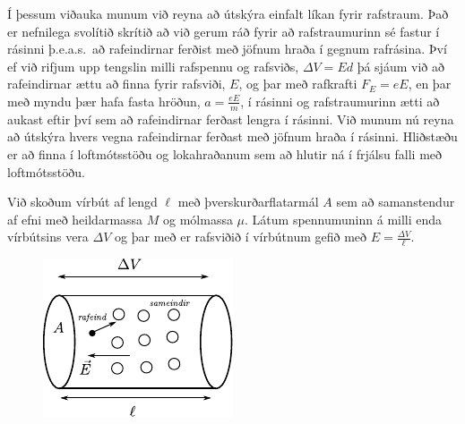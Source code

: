 \ifdefined \wholebook \else\documentclass[oneside]{book}\usepackage{EdlBook}\graphicspath{{figures/}}
\begin{document}
Í þessum viðauka munum við reyna að útskýra einfalt líkan fyrir rafstraum. Það er nefnilega svolítið skrítið að við gerum ráð fyrir að rafstraumurinn sé fastur í rásinni þ.e.a.s.~að rafeindirnar ferðist með jöfnum hraða í gegnum rafrásina. Því ef við rifjum upp tengslin milli rafspennu og rafsviðs, $\Delta V = Ed$ þá sjáum við að rafeindirnar ættu að finna fyrir rafsviði, $E$, og þar með rafkrafti $F_E = eE$, en þar með myndu þær hafa fasta hröðun, $a = \frac{eE}{m}$, í rásinni og rafstraumurinn ætti að aukast eftir því sem að rafeindirnar ferðast lengra í rásinni. Við munum nú reyna að útskýra hvers vegna rafeindirnar ferðast með jöfnum hraða í rásinni. Hliðstæðu er að finna í loftmótsstöðu og lokahraðanum sem að hlutir ná í frjálsu falli með loftmótsstöðu. \\

\vspace{0.2cm}


Við skoðum vírbút af lengd $\ell$ með þverskurðarflatarmál $A$ sem að samanstendur af efni með heildarmassa $M$ og mólmassa $\mu$. Látum spennumuninn á milli enda vírbútsins vera $\Delta V$ og þar með er rafsviðið í vírbútnum gefið með $E = \frac{\Delta V}{\ell}$. 

\begin{figure}[H]
    \centering
    \includegraphics[scale = 1.4]{figures/drude1.pdf}
\end{figure}
\end{document}
